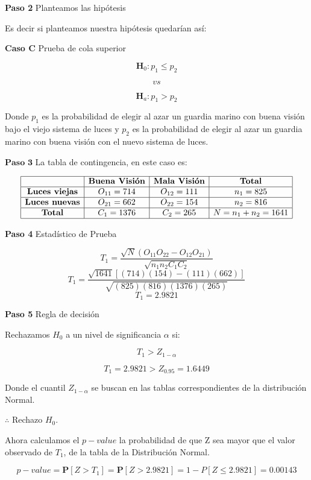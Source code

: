 \documentclass[
  a4paper,
  oneside,
  openany]{book}
\begin{document}
\textbf{Paso 2} Planteamos las hipótesis

Es decir si planteamos nuestra hipótesis quedarían así:

\textbf{Caso C} Prueba de cola superior

\[\textbf{H}_0: p_{1} \leq p_{2}\]

\[vs\]

\[\textbf{H}_a: p_{1} > p_{2}\]

Donde \(p_{1}\) es la probabilidad de elegir al azar un guardia marino con buena visión bajo el viejo sistema de luces y \(p_{2}\) es la probabilidad de elegir al azar un guardia marino con buena visión con el nuevo sistema de luces.

\(\textbf{Paso 3}\) La tabla de contingencia, en este caso es:

\[
\begin{array}{|c|c|c|c|}
\hline
 & \textbf{Buena Visión} & \textbf{Mala Visión} & \textbf{Total}   \\
\hline
\textbf{Luces viejas} & O_{11}= 714 & O_{12}=111 & n_{1}=825   \\
\hline
\textbf{Luces nuevas} & O_{21}=662 & O_{22}=154 & n_{2}=816\\
\hline
\textbf{Total}  & C_{1}=1376 & C_{2}=265   & N=n_{1}+n_{2}=1641 \\
\hline
\end{array}
\]

\textbf{Paso 4} Estadístico de Prueba

\[T_{1}=\frac{\sqrt{N}(O_{11}O_{22}-O_{12}O_{21})}{\sqrt{n_{1}n_{2}C_{1}C_{2}}}\]
\[T_{1}=\frac{\sqrt{1641}[(714)(154)-(111)(662)]}{\sqrt{(825)(816)(1376)(265)}}\]
\[T_{1}= 2.9821\]

\textbf{Paso 5} Regla de decisión

Rechazamos \(H_0\) a un nivel de significancia \(\alpha\) si:

\[T_{1} > Z_{1-\alpha}\]

\[T_{1}=2.9821 > Z_{0.95}= 1.6449\]

Donde el cuantil \(Z_{1-\alpha}\) se buscan en las tablas correspondientes de la distribución Normal.

\(\therefore\) Rechazo \(H_0\).

Ahora calculamos el \(p-value\) la probabilidad de que Z sea mayor que el valor observado de \(T_{1}\), de la tabla de la Distribución Normal.

\[p-value=\mathbf{P}[Z>T_{1}]=\mathbf{P}[Z>2.9821]=1-P[Z\leq2.9821]=0.00143\]
\end{document}
